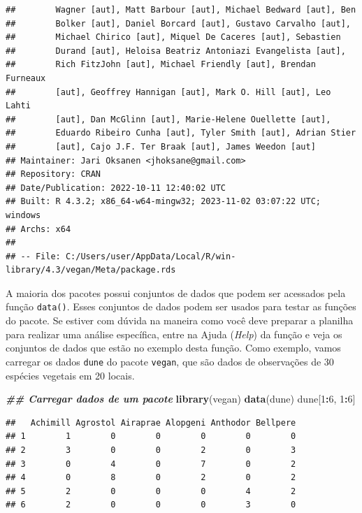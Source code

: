 \documentclass[
]{article}
\newenvironment{Shaded}{\begin{snugshade}}{\end{snugshade}}
\newcommand{\DecValTok}[1]{\textcolor[rgb]{0.00,0.00,0.81}{#1}}
\newcommand{\DocumentationTok}[1]{\textcolor[rgb]{0.56,0.35,0.01}{\textbf{\textit{#1}}}}
\newcommand{\FunctionTok}[1]{\textcolor[rgb]{0.13,0.29,0.53}{\textbf{#1}}}
\newcommand{\NormalTok}[1]{#1}
\newcommand{\SpecialCharTok}[1]{\textcolor[rgb]{0.81,0.36,0.00}{\textbf{#1}}}
\begin{document}
\begin{verbatim}
##        Wagner [aut], Matt Barbour [aut], Michael Bedward [aut], Ben
##        Bolker [aut], Daniel Borcard [aut], Gustavo Carvalho [aut],
##        Michael Chirico [aut], Miquel De Caceres [aut], Sebastien
##        Durand [aut], Heloisa Beatriz Antoniazi Evangelista [aut],
##        Rich FitzJohn [aut], Michael Friendly [aut], Brendan Furneaux
##        [aut], Geoffrey Hannigan [aut], Mark O. Hill [aut], Leo Lahti
##        [aut], Dan McGlinn [aut], Marie-Helene Ouellette [aut],
##        Eduardo Ribeiro Cunha [aut], Tyler Smith [aut], Adrian Stier
##        [aut], Cajo J.F. Ter Braak [aut], James Weedon [aut]
## Maintainer: Jari Oksanen <jhoksane@gmail.com>
## Repository: CRAN
## Date/Publication: 2022-10-11 12:40:02 UTC
## Built: R 4.3.2; x86_64-w64-mingw32; 2023-11-02 03:07:22 UTC; windows
## Archs: x64
## 
## -- File: C:/Users/user/AppData/Local/R/win-library/4.3/vegan/Meta/package.rds
\end{verbatim}

A maioria dos pacotes possui conjuntos de dados que podem ser acessados pela função \texttt{data()}. Esses conjuntos de dados podem ser usados para testar as funções do pacote. Se estiver com dúvida na maneira como você deve preparar a planilha para realizar uma análise específica, entre na Ajuda (\emph{Help}) da função e veja os conjuntos de dados que estão no exemplo desta função. Como exemplo, vamos carregar os dados \texttt{dune} do pacote \texttt{vegan}, que são dados de observações de 30 espécies vegetais em 20 locais.

\begin{Shaded}
\begin{Highlighting}[]
\DocumentationTok{\#\# Carregar dados de um pacote}
\FunctionTok{library}\NormalTok{(vegan)}
\FunctionTok{data}\NormalTok{(dune)}
\NormalTok{dune[}\DecValTok{1}\SpecialCharTok{:}\DecValTok{6}\NormalTok{, }\DecValTok{1}\SpecialCharTok{:}\DecValTok{6}\NormalTok{]}
\end{Highlighting}
\end{Shaded}

\begin{verbatim}
##   Achimill Agrostol Airaprae Alopgeni Anthodor Bellpere
## 1        1        0        0        0        0        0
## 2        3        0        0        2        0        3
## 3        0        4        0        7        0        2
## 4        0        8        0        2        0        2
## 5        2        0        0        0        4        2
## 6        2        0        0        0        3        0
\end{verbatim}
\end{document}
